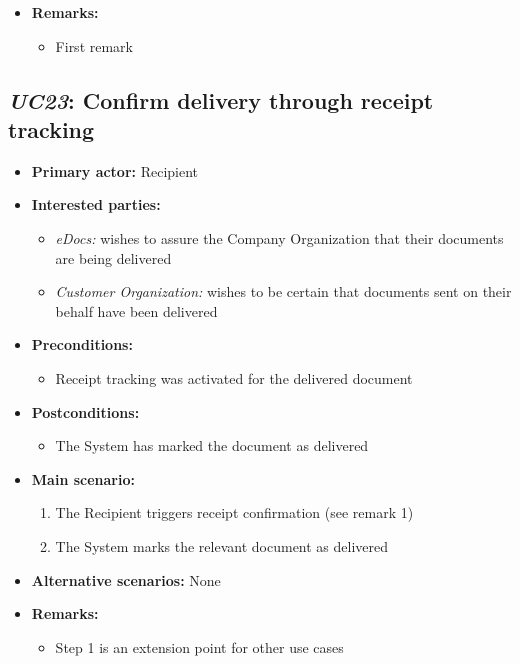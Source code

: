 \documentclass[a4paper,10pt]{article}
\begin{document}
\begin{itemize}
	\item \textbf{Remarks:}
	\begin{itemize}
		\item First remark
	\end{itemize}
\end{itemize}

\subsection{\emph{UC23}: Confirm delivery through receipt tracking}
\begin{itemize}
	\item \textbf{Primary actor:} Recipient
	\item \textbf{Interested parties:} 
	\begin{itemize}
		\item \textit{eDocs:} wishes to assure the Company Organization that their documents are being delivered
		\item \textit{Customer Organization:} wishes to be certain that documents sent on their behalf have been delivered
	\end{itemize}
	
	\item \textbf{Preconditions:}
	\begin{itemize}
		\item Receipt tracking was activated for the delivered document
	\end{itemize}
	
	\item \textbf{Postconditions:}
	\begin{itemize}
		\item The System has marked the document as delivered
	\end{itemize}
	
	\item \textbf{Main scenario:} 
	\begin{enumerate}
		\item The Recipient triggers receipt confirmation (see remark 1)
		\item The System marks the relevant document as delivered
	\end{enumerate}
	
	\item \textbf{Alternative scenarios:} 
	None
	
	\item \textbf{Remarks:}
	\begin{itemize}
		\item Step 1 is an extension point for other use cases
	\end{itemize}
\end{itemize}
\end{document}

